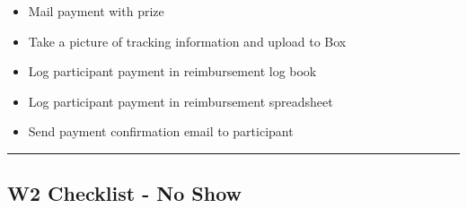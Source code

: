 \documentclass[
]{book}
\providecommand{\tightlist}{%
  \setlength{\itemsep}{0pt}\setlength{\parskip}{0pt}}
\begin{document}
\begin{itemize}
\tightlist
\item
  Mail payment with prize
\item
  Take a picture of tracking information and upload to Box
\item
  Log participant payment in reimbursement log book
\item
  Log participant payment in reimbursement spreadsheet
\item
  Send payment confirmation email to participant
\end{itemize}

\begin{center}\rule{0.5\linewidth}{0.5pt}\end{center}

\hypertarget{w2-checklist---no-show}{%
\subsection{W2 Checklist - No Show}\label{w2-checklist---no-show}}
\end{document}
